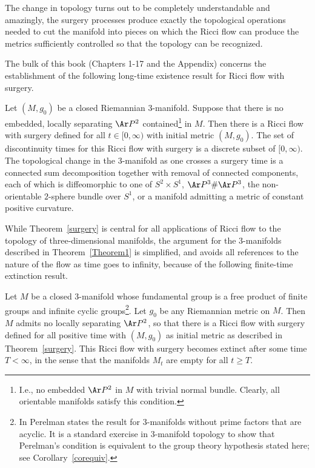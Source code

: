 The change in topology turns out to be completely understandable and
amazingly, the surgery processes produce exactly the topological
operations needed to cut the manifold into pieces on which the Ricci
flow can produce the metrics sufficiently controlled so that the
topology can be recognized.

The bulk of this book (Chapters 1-17 and the Appendix) concerns the
establishment of the following long-time existence result for Ricci
flow with surgery.

\begin{theorem}
\label{thm:ricci-flow-surgery-existence}\label{surgery} Let $(M,g_0)$ be a closed Riemannian $3$-manifold.
Suppose that there is no embedded, locally separating $\Ar P^2$
contained\footnote{I.e., no embedded $\Ar P^2$ in $M$ with trivial
normal bundle. Clearly, all orientable manifolds satisfy this
condition.} in $M$. Then there is a Ricci flow with surgery defined
for all $t\in [0,\infty)$ with initial metric $(M,g_0)$. The set of
discontinuity times for this Ricci flow with surgery is a discrete
subset of $[0,\infty)$. The topological change in the $3$-manifold
as one crosses a surgery time is a connected sum decomposition
together with removal of connected components, each of which is
diffeomorphic to one of $S^2\times S^1$, $\Ar P^3\#\Ar P^3$, the
non-orientable $2$-sphere bundle over $S^1$, or a manifold admitting
a metric of constant positive curvature.
\end{theorem}




While Theorem~\ref{surgery} is central for all applications of Ricci
flow to the topology of three-dimensional manifolds, the argument
for the $3$-manifolds described in Theorem~\ref{Theorem1} is
simplified, and avoids all references to the nature of the flow  as
time goes to infinity, because of the following finite-time
extinction result.

\begin{theorem}
\label{thm:ricci-flow-surgery-finite-extinction}
\label{finiteext}
Let $M$ be a closed $3$-manifold whose fundamental group is a free
product of finite groups and infinite cyclic groups\footnote{In
\cite{Perelman3} Perelman states the result for $3$-manifolds
without prime factors that are acyclic. It is a standard exercise in
$3$-manifold topology to show that Perelman's condition is
equivalent to the group theory hypothesis stated here; see
Corollary~\ref{corequiv}.}. Let $g_0$ be any Riemannian metric on
$M$. Then $M$ admits no locally separating $\Ar P^2$, so that there
is a Ricci flow with surgery defined for all positive time with
$(M,g_0)$ as initial metric as described in Theorem~\ref{surgery}.
This Ricci flow with surgery becomes extinct after some time
$T<\infty$, in the sense that the manifolds $M_t$ are empty for all
$t\ge T$.
\end{theorem}

